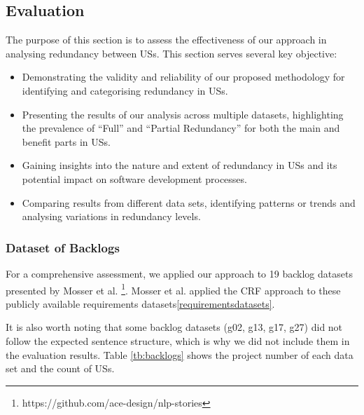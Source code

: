\subsection{Evaluation}\label{redundancy_evaluation}

The purpose of this section is to assess the effectiveness of our approach in analysing redundancy between USs. This section serves several key objective:
\begin{itemize}
	\item Demonstrating the validity and reliability of our proposed methodology for identifying and categorising redundancy in USs.
	\item Presenting the results of our analysis across multiple datasets, highlighting the prevalence of \enquote{Full} and \enquote{Partial Redundancy} for both the main and benefit parts in USs.
	\item Gaining insights into the nature and extent of redundancy in USs and its potential impact on software development processes.
	\item Comparing results from different data sets, identifying patterns or trends and analysing variations in redundancy levels.
\end{itemize}
\subsubsection*{Dataset of Backlogs}
For a comprehensive assessment, we applied our approach to 19 backlog datasets presented by Mosser et al. \footnote{https://github.com/ace-design/nlp-stories}. Mosser et al. applied the CRF approach to these publicly available requirements datasets\ref{requirementsdatasets}.

It is also worth noting that some backlog datasets (g02, g13, g17, g27) did not follow the expected sentence structure, which is why we did not include them in the evaluation results.
Table \ref{tb:backlogs} shows the project number of each data set and the count of USs.
 
